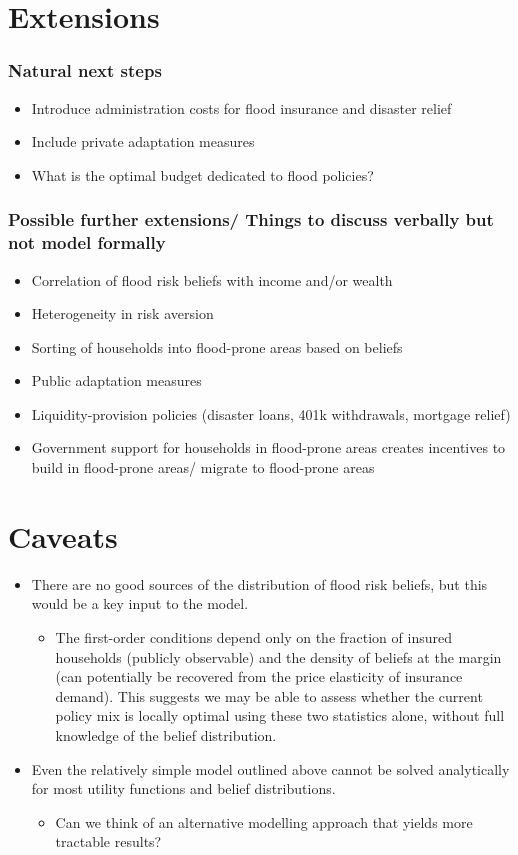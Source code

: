 \documentclass[12pt]{article}
\begin{document}
\section{Extensions}
\subsubsection*{Natural next steps}
\begin{itemize}
    \item Introduce administration costs for flood insurance and disaster relief
    \item Include private adaptation measures
    \item What is the optimal budget dedicated to flood policies?
\end{itemize}
\subsubsection*{Possible further extensions/ Things to discuss verbally but not model formally}
\begin{itemize}
    \item Correlation of flood risk beliefs with income and/or wealth
    \item Heterogeneity in risk aversion
    \item Sorting of households into flood-prone areas based on beliefs
    \item Public adaptation measures
    \item Liquidity-provision policies (disaster loans, 401k withdrawals, mortgage relief)
    \item Government support for households in flood-prone areas creates incentives to build in flood-prone areas/ migrate to flood-prone areas
\end{itemize}

\section{Caveats}
\begin{itemize}
    \item There are no good sources of the distribution of flood risk beliefs, but this would be a key input to the model.
    \begin{itemize}
        \item The first-order conditions depend only on the fraction of insured households (publicly observable) and the density of beliefs at the margin (can potentially be recovered from the price elasticity of insurance demand). This suggests we may be able to assess whether the current policy mix is locally optimal using these two statistics alone, without full knowledge of the belief distribution.
    \end{itemize}
    \item Even the relatively simple model outlined above cannot be solved analytically for most utility functions and belief distributions.
    \begin{itemize}
        \item Can we think of an alternative modelling approach that yields more tractable results? 
    \end{itemize}
\end{itemize}
\end{document}
